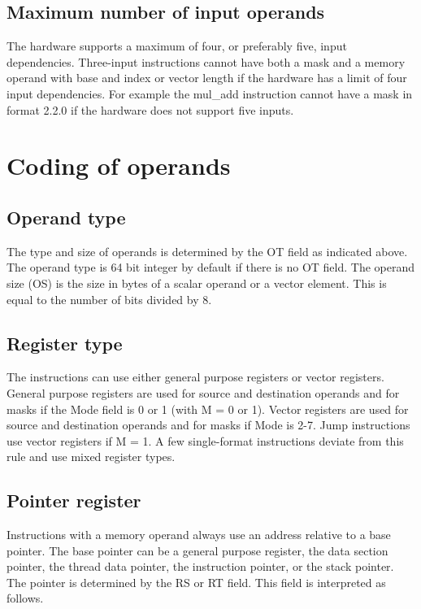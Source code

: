 \documentclass[forwardcom.tex]{subfiles}
\begin{document}
\vspace{2mm}
\subsection{Maximum number of input operands}
The hardware supports a maximum of four, or preferably five, input dependencies. Three-input instructions cannot have both a mask and a memory operand with base and index or vector length if the hardware has a limit of four input dependencies. For example the mul\_add instruction cannot have a mask in format 2.2.0 if the hardware does not support five inputs.

\vspace{2mm}
\section{Coding of operands}
\subsection{Operand type}
The type and size of operands is determined by the OT field as indicated above. The operand type is 64 bit integer by default if there is no OT field. The operand size (OS) is the size in bytes of a scalar operand or a vector element. This is equal to the number of bits divided by 8.

\subsection{Register type}
The instructions can use either general purpose registers or vector registers. General purpose registers are used for source and destination operands and for masks if the Mode field is 0 or 1 (with M = 0 or 1). Vector registers are used for source and destination operands and for masks if Mode is 2-7. Jump instructions use vector registers if M = 1. A few single-format instructions deviate from this rule and use mixed register types.

\subsection{Pointer register}
Instructions with a memory operand always use an address relative to a base pointer. The base pointer can be a general purpose register, the data section pointer, the thread data pointer,
the instruction pointer, or the stack pointer. The pointer is determined by the RS or RT field. This field is interpreted as follows.
\vspace{2mm}
\end{document}
